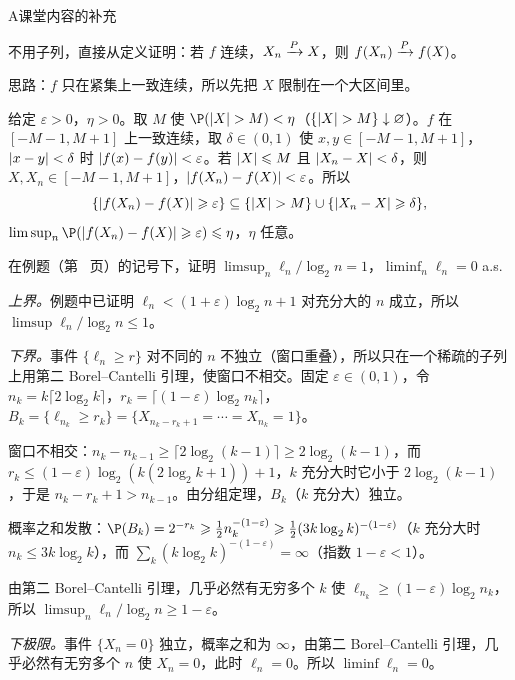 \begin{exercises}{A}{课堂内容的补充}
\item\label{ex:borel-cantelli:A1} 不用子列，直接从定义证明：若 $f$ 连续，$X_n\xrightarrow{P} X$，则 $f(X_n)\xrightarrow{P} f(X)$。
\begin{solution}
思路：$f$ 只在紧集上一致连续，所以先把 $X$ 限制在一个大区间里。

给定 $\varepsilon>0$，$\eta>0$。取 $M$ 使 $\P(\abs X>M)<\eta$（$\{\lvert X\rvert>M\}\downarrow\varnothing$）。$f$ 在 $[-M-1,M+1]$ 上一致连续，取 $\delta\in(0,1)$ 使 $x,y\in[-M-1,M+1]$，$\lvert x-y\rvert<\delta$ 时 $\lvert f(x)-f(y)\rvert<\varepsilon$。若 $\lvert X\rvert\leqslant M$ 且 $\lvert X_n-X\rvert<\delta$，则 $X,X_n\in[-M-1,M+1]$，$\lvert f(X_n)-f(X)\rvert<\varepsilon$。所以
\[
\{\lvert f(X_n)-f(X)\rvert\geqslant\varepsilon\}\subseteq\{\lvert X\rvert>M\}\cup\{\lvert X_n-X\rvert\geqslant\delta\},
\]
$\limsup_n\P(\abs{f(X_n)-f(X)}\geqslant\varepsilon)\leqslant\eta$，$\eta$ 任意。
\end{solution}

\item\label{ex:borel-cantelli:A2} 在例题（第~\pageref{we:borel-cantelli:head-runs} 页）的记号下，证明 $\limsup_n\ell_n/\log_2n=1$，$\liminf_n\ell_n=0$ a.s.
\begin{solution}
\emph{上界。}例题中已证明 $\ell_n<(1+\varepsilon)\log_2n+1$ 对充分大的 $n$ 成立，所以 $\limsup\ell_n/\log_2n\leqslant1$。

\emph{下界。}事件 $\{\ell_n\geqslant r\}$ 对不同的 $n$ 不独立（窗口重叠），所以只在一个稀疏的子列上用第二 Borel--Cantelli 引理，使窗口不相交。固定 $\varepsilon\in(0,1)$，令 $n_k=k\lceil2\log_2k\rceil$，$r_k=\lceil(1-\varepsilon)\log_2n_k\rceil$，$B_k=\{\ell_{n_k}\geqslant r_k\}=\{X_{n_k-r_k+1}=\cdots=X_{n_k}=1\}$。

窗口不相交：$n_k-n_{k-1}\geqslant\lceil2\log_2(k-1)\rceil\geqslant2\log_2(k-1)$，而 $r_k\leqslant(1-\varepsilon)\log_2(k(2\log_2k+1))+1$，$k$ 充分大时它小于 $2\log_2(k-1)$，于是 $n_k-r_k+1>n_{k-1}$。由分组定理，$B_k$（$k$ 充分大）独立。

概率之和发散：$\P(B_k)=2^{-r_k}\geqslant\frac12n_k^{-(1-\varepsilon)}\geqslant\frac12(3k\log_2k)^{-(1-\varepsilon)}$（$k$ 充分大时 $n_k\leqslant3k\log_2k$），而 $\sum_k(k\log_2k)^{-(1-\varepsilon)}=\infty$（指数 $1-\varepsilon<1$）。

由第二 Borel--Cantelli 引理，几乎必然有无穷多个 $k$ 使 $\ell_{n_k}\geqslant(1-\varepsilon)\log_2n_k$，所以 $\limsup_n\ell_n/\log_2n\geqslant1-\varepsilon$。

\emph{下极限。}事件 $\{X_n=0\}$ 独立，概率之和为 $\infty$，由第二 Borel--Cantelli 引理，几乎必然有无穷多个 $n$ 使 $X_n=0$，此时 $\ell_n=0$。所以 $\liminf\ell_n=0$。


\end{solution}
\end{exercises}
